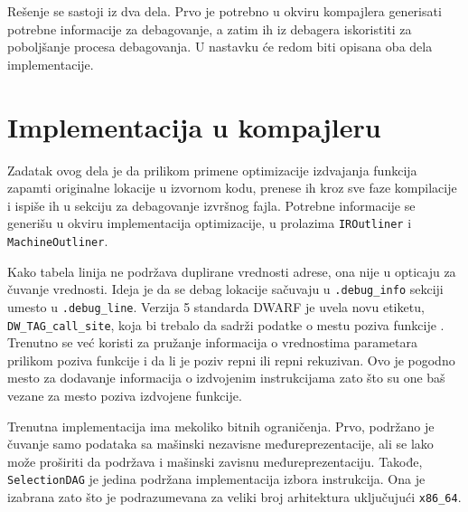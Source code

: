 \documentclass[12pt,oneside]{memoir}
\begin{document}
Rešenje se sastoji iz dva dela.
Prvo je potrebno u okviru kompajlera generisati potrebne informacije za debagovanje, a zatim ih iz debagera iskoristiti za poboljšanje procesa debagovanja.
U nastavku će redom biti opisana oba dela implementacije.


\section{Implementacija u kompajleru}


Zadatak ovog dela je da prilikom primene optimizacije izdvajanja funkcija zapamti originalne lokacije u izvornom kodu, prenese ih kroz sve faze kompilacije i ispiše ih u sekciju za debagovanje izvršnog fajla.
Potrebne informacije se generišu u okviru implementacija optimizacije, u prolazima \verb|IROutliner| i \verb|MachineOutliner|.

Kako tabela linija ne podržava duplirane vrednosti adrese, ona nije u opticaju za čuvanje vrednosti.
Ideja je da se debag lokacije sačuvaju u \verb|.debug_info| sekciji umesto u \verb|.debug_line|.
Verzija 5 standarda DWARF je uvela novu etiketu, \verb|DW_TAG_call_site|, koja bi trebalo da sadrži podatke o mestu poziva funkcije \cite{jelinek2010callsite}.
Trenutno se već koristi za pružanje informacija o vrednostima parametara prilikom poziva funkcije \cite{jelinek2010entryvalue} i da li je poziv repni ili repni rekuzivan. %
Ovo je pogodno mesto za dodavanje informacija o izdvojenim instrukcijama zato što su one baš vezane za mesto poziva izdvojene funkcije.

Trenutna implementacija ima mekoliko bitnih ograničenja.
Prvo, podržano je čuvanje samo podataka sa mašinski nezavisne međureprezentacije, ali se lako može proširiti da podržava i mašinski zavisnu međureprezentaciju.
Takođe, \verb|SelectionDAG| je jedina podržana implementacija izbora instrukcija.
Ona je izabrana zato što je podrazumevana za veliki broj arhitektura uključujući \verb|x86_64|.
\end{document}
